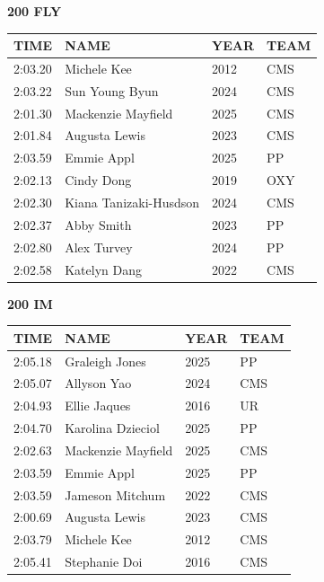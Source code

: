 \begin{table}[H]
\centering
\begin{minipage}[t]{0.48\textwidth}
\centering
\textbf{200 FLY}\\[0.1cm]
\begin{tabular}{@{}p{1.8cm}p{2.8cm}p{1.2cm}p{1.4cm}@{}}
\hline
    \textbf{TIME} & \textbf{NAME} & \textbf{YEAR} & \textbf{TEAM} \\
\hline
    2:03.20 & Michele Kee & 2012 & CMS \\
    2:03.22 & Sun Young Byun & 2024 & CMS \\
    2:01.30 & Mackenzie Mayfield & 2025 & CMS \\
    2:01.84 & Augusta Lewis & 2023 & CMS \\
    2:03.59 & Emmie Appl & 2025 & PP \\
    2:02.13 & Cindy Dong & 2019 & OXY \\
    2:02.30 & Kiana Tanizaki-Husdson & 2024 & CMS \\
    2:02.37 & Abby Smith & 2023 & PP \\
    2:02.80 & Alex Turvey & 2024 & PP \\
    2:02.58 & Katelyn Dang & 2022 & CMS \\
\hline
\end{tabular}
\end{minipage}\hfill
\begin{minipage}[t]{0.48\textwidth}
\centering
\textbf{200 IM}\\[0.1cm]
\begin{tabular}{@{}p{1.8cm}p{2.8cm}p{1.2cm}p{1.4cm}@{}}
\hline
    \textbf{TIME} & \textbf{NAME} & \textbf{YEAR} & \textbf{TEAM} \\
\hline
    2:05.18 & Graleigh Jones & 2025 & PP \\
    2:05.07 & Allyson Yao & 2024 & CMS \\
    2:04.93 & Ellie Jaques & 2016 & UR \\
    2:04.70 & Karolina Dzieciol & 2025 & PP \\
    2:02.63 & Mackenzie Mayfield & 2025 & CMS \\
    2:03.59 & Emmie Appl & 2025 & PP \\
    2:03.59 & Jameson Mitchum & 2022 & CMS \\
    2:00.69 & Augusta Lewis & 2023 & CMS \\
    2:03.79 & Michele Kee & 2012 & CMS \\
    2:05.41 & Stephanie Doi & 2016 & CMS \\
\hline
\end{tabular}
\end{minipage}
\end{table}


